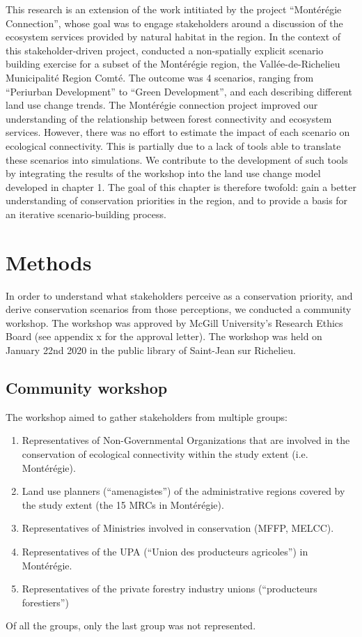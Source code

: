 This research is an extension of the work intitiated by the project “Montérégie Connection”, whose goal was to engage stakeholders around a discussion of the ecosystem services provided by natural habitat in the region. In the context of this stakeholder-driven project, \cite{mitchell_monteregie_2015} conducted a non-spatially explicit scenario building exercise for a subset of the Montérégie region, the Vallée-de-Richelieu Municipalité Region Comté. The outcome was 4 scenarios, ranging from “Periurban Development” to “Green Development”, and each describing different land use change trends. The Montérégie connection project improved our understanding of the relationship between forest connectivity and ecosystem services. However, there was no effort to estimate the impact of each scenario on ecological connectivity. This is partially due to a lack of tools able to translate these scenarios into simulations. We contribute to the development of such tools by integrating the results of the workshop into the land use change model developed in chapter 1. The goal of this chapter is therefore twofold: gain a better understanding of conservation priorities in the region, and to provide a basis for an iterative scenario-building process. \\

\section{Methods}

In order to understand what stakeholders perceive as a conservation priority, and derive conservation scenarios from those perceptions, we conducted a community workshop. The workshop was approved by McGill University’s Research Ethics Board (see appendix {x} for the approval letter). The workshop was held on January 22nd 2020 in the public library of Saint-Jean sur Richelieu. \\

\subsection{Community workshop}

The workshop aimed to gather stakeholders from multiple groups:
\begin{enumerate}
  \item Representatives of Non-Governmental Organizations that are involved in the conservation of ecological connectivity within the study extent (i.e. Montérégie).
  \item Land use planners (“amenagistes”) of the administrative regions covered by the study extent (the 15 MRCs in Montérégie).
  \item Representatives of Ministries involved in conservation (MFFP, MELCC).
  \item Representatives of the UPA (“Union des producteurs agricoles”) in Montérégie.
  \item Representatives of the private forestry industry unions (“producteurs forestiers”)
\end{enumerate}
Of all the groups, only the last group was not represented. \\

